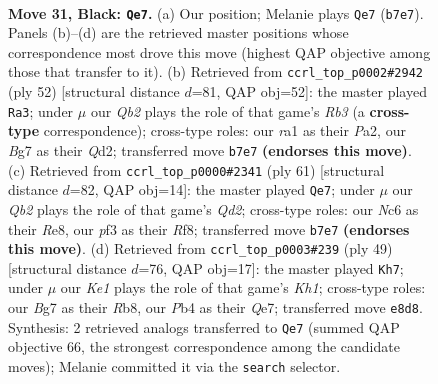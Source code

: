\documentclass[11pt]{article}
\begin{document}
\clearpage

\begin{figure}[p]\centering
\begin{subfigure}{0.46\textwidth}\centering
\resizebox{\linewidth}{!}{%
\newchessgame
\chessboard[
  setfen={r3k2r/1q4bp/p1npQ1p1/4p1P1/1p2P2P/5P1B/PPPK1B2/R1R5 b - - 0 31},
  showmover=false,
  pgfstyle=straightmove, color=movearrow, markmove={b7-e7}
]}
\caption{}
\end{subfigure}\hfill
\begin{subfigure}{0.46\textwidth}\centering
\resizebox{\linewidth}{!}{%
\newchessgame
\chessboard[
  setfen={2r3k1/p2br1p1/1pp2p2/3p4/1P1Pq2p/1R2P2P/P2QNPP1/5R1K w - - 2 27},
  showmover=false,
  pgfstyle=straightmove, color=movearrow, markmove={b3-a3}
]}
\caption{}
\end{subfigure}
\\[4pt]
\begin{subfigure}{0.46\textwidth}\centering
\resizebox{\linewidth}{!}{%
\newchessgame
\chessboard[
  setfen={4rr2/3q1n2/pPp3pk/2P1pp1p/2Pp4/Q2B1P1P/P3R1P1/4R2K b - - 0 31},
  showmover=false,
  pgfstyle=straightmove, color=movearrow, markmove={d7-e7}
]}
\caption{}
\end{subfigure}\hfill
\begin{subfigure}{0.46\textwidth}\centering
\resizebox{\linewidth}{!}{%
\newchessgame
\chessboard[
  setfen={1r1r3k/4qpp1/p2p3p/1pn1pP2/4P2P/P4P2/1PPQB1R1/1K1R4 b - - 1 25},
  showmover=false,
  pgfstyle=straightmove, color=movearrow, markmove={h8-h7}
]}
\caption{}
\end{subfigure}
\caption{\textbf{Move 31, Black: \texttt{Qe7}.} (a) Our position; Melanie plays \texttt{Qe7} (\texttt{b7e7}). Panels (b)--(d) are the retrieved master positions whose correspondence most drove this move (highest QAP objective among those that transfer to it). (b) Retrieved from \texttt{ccrl\_top\_p0002\#2942} (ply 52) [structural distance $d$=81, QAP obj=52]: the master played \texttt{Ra3}; under $\mu$ our \emph{Qb2} plays the role of that game's \emph{Rb3} (a \textbf{cross-type} correspondence); cross-type roles: our \emph{r}a1 as their \emph{P}a2, our \emph{B}g7 as their \emph{Q}d2; transferred move \texttt{b7e7} \textbf{(endorses this move)}. (c) Retrieved from \texttt{ccrl\_top\_p0000\#2341} (ply 61) [structural distance $d$=82, QAP obj=14]: the master played \texttt{Qe7}; under $\mu$ our \emph{Qb2} plays the role of that game's \emph{Qd2}; cross-type roles: our \emph{N}c6 as their \emph{R}e8, our \emph{p}f3 as their \emph{R}f8; transferred move \texttt{b7e7} \textbf{(endorses this move)}. (d) Retrieved from \texttt{ccrl\_top\_p0003\#239} (ply 49) [structural distance $d$=76, QAP obj=17]: the master played \texttt{Kh7}; under $\mu$ our \emph{Ke1} plays the role of that game's \emph{Kh1}; cross-type roles: our \emph{B}g7 as their \emph{R}b8, our \emph{P}b4 as their \emph{Q}e7; transferred move \texttt{e8d8}. Synthesis: 2 retrieved analogs transferred to \texttt{Qe7} (summed QAP objective 66, the strongest correspondence among the candidate moves); Melanie committed it via the \texttt{search} selector.}
\label{fig:thought-m61}
\end{figure}
\end{document}
